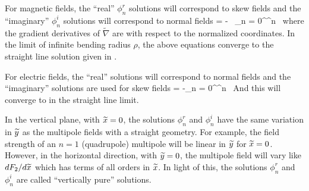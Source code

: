 For magnetic fields, the ``real'' $\phi_n^r$ solutions will correspond to skew fields and the
``imaginary'' $\phi_n^i$ solutions will correspond to normal fields
\Begineq
  \bfB = - \, 
    \sum_{n = 0}^\infty \rho^n \, 
  \label{bpql}
\Endeq
where the gradient derivatives of $\widetilde \nabla$ are with respect to the normalized
coordinates. In the limit of infinite bending radius $\rho$, the above equations converge
to the straight line solution given in .

For electric fields, the ``real'' solutions will correspond to normal fields and the
``imaginary'' solutions are used for skew fields
\Begineq
  \bfE = -\sum_{n = 0}^\infty \rho^n \, 
  \label{enrn}
\Endeq
And this will converge to  in the straight line limit.

In the vertical plane, with ${\widetilde x} = 0$, the solutions $\phi_n^r$ and $\phi_n^i$ have the same
variation in ${\widetilde y}$ as the multipole fields with a straight geometry. For example, the field
strength of an $n = 1$ (quadrupole) multipole will be linear in ${\widetilde y}$ for ${\widetilde x} = 0$. However, in the
horizontal direction, with ${\widetilde y} = 0$, the multipole field will vary like $dF_2/d{\widetilde x}$ which has
terms of all orders in ${\widetilde x}$. In light of this, the solutions $\phi_n^r$ and $\phi_n^i$ are
called ``vertically pure'' solutions.

